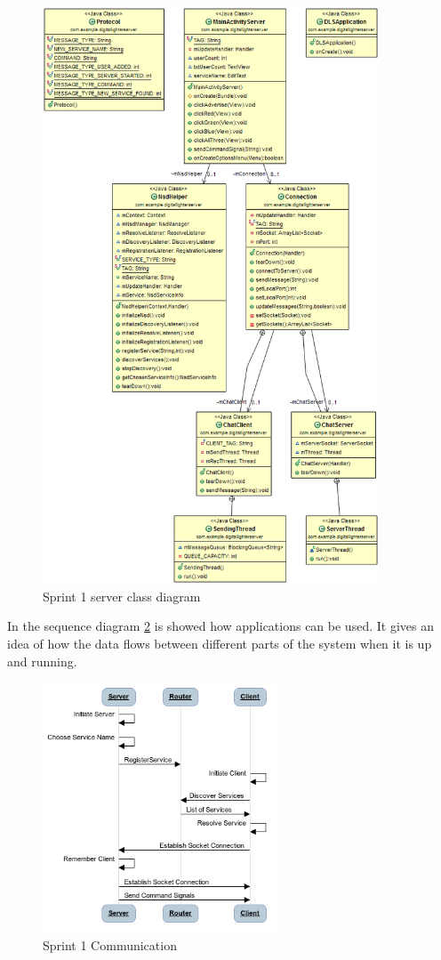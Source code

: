 \begin{figure}[!Ht]
	\centering
		\includegraphics[width=10cm]{sprint1/class_diagram_server.png}
	\caption{Sprint 1 server class diagram}
	\label{fig:class_diagram_server}
\end{figure}

In the sequence diagram \ref{fig:sprint1_communication} is showed how applications can be used. It gives an idea of how the data flows between different parts of the system when it is up and running.

\begin{figure}[!Ht]
	\centering
		\includegraphics[width=7cm]{sprint1/communication.png}
	\caption{Sprint 1 Communication}
	\label{fig:sprint1_communication}
\end{figure}


